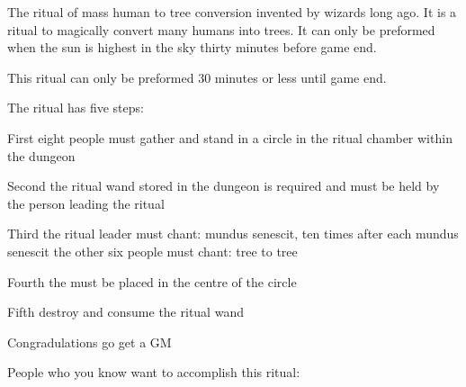 \documentclass[green]{guildcamp2}
\begin{document}
\name{\gTreeRitual{}}
The ritual of mass human to tree conversion invented by wizards long ago. It is a ritual to magically convert many humans into trees. It can only be preformed when the sun is highest in the sky thirty minutes before game end. 

This ritual can only be preformed 30 minutes or less until game end.

The ritual has five steps: 

First eight people must gather and stand in a circle in the ritual chamber within the dungeon

Second the ritual wand stored in the dungeon is required and must be held by the person leading the ritual

Third the ritual leader must chant: mundus senescit, ten times after each mundus senescit the other six people must chant: tree to tree

Fourth the \iNatureIdol{} must be placed in the centre of the circle 

Fifth destroy and consume the ritual wand

Congradulations go get a GM

People who you know want to accomplish this ritual:
\end{document}
